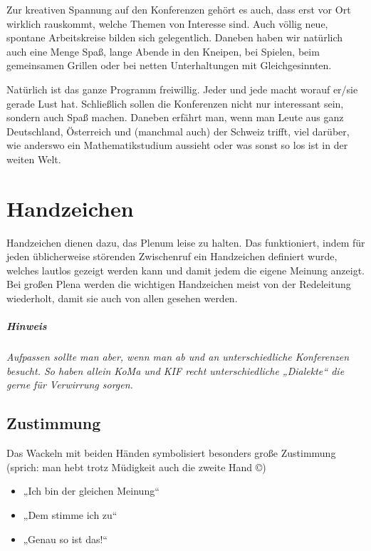 \documentclass{neulingsheft}
\begin{document}
{Zur kreativen Spannung auf den Konferenzen gehört es auch, dass erst vor Ort
wirklich rauskommt, welche Themen von Interesse sind. Auch völlig neue,
spontane Arbeitskreise bilden sich gelegentlich. Daneben haben wir natürlich
auch eine Menge Spaß, lange Abende in den Kneipen, bei Spielen, beim
gemeinsamen Grillen oder bei netten Unterhaltungen mit Gleichgesinnten.

Natürlich ist das ganze Programm freiwillig. Jeder und jede macht worauf er/sie
gerade Lust hat. Schließlich sollen die Konferenzen nicht nur interessant sein,
sondern auch Spaß machen.  Daneben erfährt man, wenn man Leute aus ganz
Deutschland, Österreich und (manchmal auch) der Schweiz trifft, viel darüber,
wie anderswo ein Mathematikstudium aussieht oder was sonst so los ist in der
weiten Welt.

\chapter{Handzeichen}

Handzeichen dienen dazu, das Plenum leise zu halten. Das funktioniert, indem
für jeden üblicherweise störenden Zwischenruf ein Handzeichen definiert wurde,
welches lautlos gezeigt werden kann und damit jedem die eigene Meinung anzeigt.
Bei großen Plena werden die wichtigen Handzeichen meist von der Redeleitung
wiederholt, damit sie auch von allen gesehen werden.

\paragraph{Hinweis} \emph{Aufpassen sollte man aber, wenn man ab und an
unterschiedliche Konferenzen besucht. So haben allein KoMa und KIF recht
unterschiedliche „Dialekte“ die gerne für Verwirrung sorgen.}

\section{Zustimmung}
Das Wackeln mit beiden Händen symbolisiert %
besonders große Zustimmung (sprich: man hebt trotz Müdigkeit auch die zweite
Hand ©) %
\begin{itemize}
	\item „Ich bin der gleichen Meinung“
	\item „Dem stimme ich zu“
	\item „Genau so ist das!“
\end{itemize}

}
\end{document}
